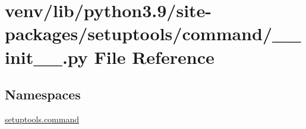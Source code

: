 \hypertarget{venv_2lib_2python3_89_2site-packages_2setuptools_2command_2____init_____8py}{}\section{venv/lib/python3.9/site-\/packages/setuptools/command/\+\_\+\+\_\+init\+\_\+\+\_\+.py File Reference}
\label{venv_2lib_2python3_89_2site-packages_2setuptools_2command_2____init_____8py}
\subsection*{Namespaces}
\begin{DoxyCompactItemize}
\item 
 \hyperlink{namespacesetuptools_1_1command}{setuptools.\+command}
\end{DoxyCompactItemize}
